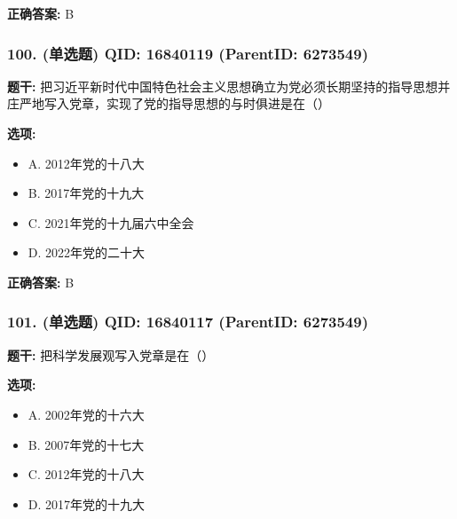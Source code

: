 \documentclass[12pt,UTF8]{ctexart}
\begin{document}
\textbf{正确答案:}
B

\vspace{0.3em}\hrulefill\vspace{0.7em}

\subsubsection*{100. (单选题) \small QID: 16840119 (ParentID: 6273549)}

\textbf{题干:}
把习近平新时代中国特色社会主义思想确立为党必须长期坚持的指导思想并庄严地写入党章，实现了党的指导思想的与时俱进是在（）



\textbf{选项:}
\begin{itemize}[leftmargin=*]

  \item A. 2012年党的十八大

  \item B. 2017年党的十九大

  \item C. 2021年党的十九届六中全会

  \item D. 2022年党的二十大

\end{itemize}

\textbf{正确答案:}
B

\vspace{0.3em}\hrulefill\vspace{0.7em}

\subsubsection*{101. (单选题) \small QID: 16840117 (ParentID: 6273549)}

\textbf{题干:}
把科学发展观写入党章是在（）



\textbf{选项:}
\begin{itemize}[leftmargin=*]

  \item A. 2002年党的十六大

  \item B. 2007年党的十七大

  \item C. 2012年党的十八大

  \item D. 2017年党的十九大

\end{itemize}
\end{document}
